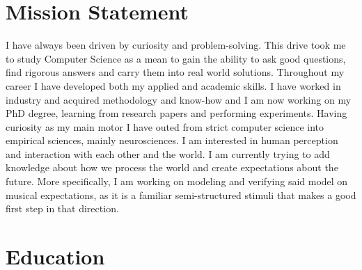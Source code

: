 \documentclass[a4paper]{deedy-resume} %
\begin{document}




\section{Mission Statement}

\begin{flushleft}
I have always been driven by curiosity and problem-solving. This drive took me
to study Computer Science as a mean to gain the ability to ask good
questions, find rigorous answers and carry them into real world solutions.
Throughout my career I have developed both my applied and academic skills. I
have worked in industry and acquired methodology and know-how and I am now
working on my PhD degree, learning from research papers and performing
experiments. Having curiosity as my main motor I have outed from strict
computer science into empirical sciences, mainly neurosciences. I am
interested in human perception and interaction with each other and the
world. I am currently trying to add knowledge about how we process the world
and create expectations about the future. More specifically, I am working on
modeling and verifying said model on musical expectations, as it is a familiar
semi-structured stimuli that makes a good first step in that direction.
\end{flushleft}


\section{Education} 
\end{document}
